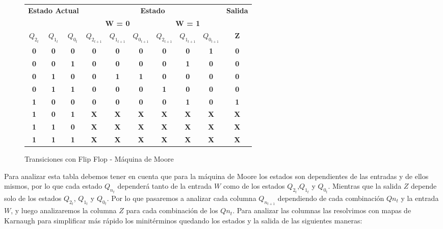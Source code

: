 \documentclass[10pt,a4paper]{article}
\begin{document}
\begin{figure}[H]
	\begin{center}
		\begin{tabular}{|c|c|c|c|c|c|c|c|c|c|}
\hline
\multicolumn{3}{|c|}{\multirow{2}{*}{\textbf{Estado Actual}}} & \multicolumn{6}{c|}{\textbf{Estado}} & \multirow{2}{*}{\textbf{Salida}} \\ \cline{4-9}
\multicolumn{3}{|c|}{} & \multicolumn{3}{c|}{\textbf{W = 0}} & \multicolumn{3}{c|}{\textbf{W = 1}} &  \\ \hline
\textbf{$Q_{2_{t}}$} & \textbf{$Q_{1_{t}}$} & \textbf{$Q_{0_{t}}$} & \textbf{$Q_{2_{t+1}}$} & \textbf{$Q_{1_{t+1}}$} & \textbf{$Q_{0_{t+1}}$} & \textbf{$Q_{2_{t+1}}$} & \textbf{$Q_{1_{t+1}}$} & \textbf{$Q_{0_{t+1}}$} & \textbf{Z} \\ \hline
\textbf{0} & \textbf{0} & \textbf{0} & \textbf{0} & \textbf{0} & \textbf{0} & \textbf{0} & \textbf{0} & \textbf{1} & \textbf{0} \\ \hline
\textbf{0} & \textbf{0} & \textbf{1} & \textbf{0} & \textbf{0} & \textbf{0} & \textbf{0} & \textbf{1} & \textbf{0} & \textbf{0} \\ \hline
\textbf{0} & \textbf{1} & \textbf{0} & \textbf{0} & \textbf{1} & \textbf{1} & \textbf{0} & \textbf{0} & \textbf{0} & \textbf{0} \\ \hline
\textbf{0} & \textbf{1} & \textbf{1} & \textbf{0} & \textbf{0} & \textbf{0} & \textbf{1} & \textbf{0} & \textbf{0} & \textbf{0} \\ \hline
\textbf{1} & \textbf{0} & \textbf{0} & \textbf{0} & \textbf{0} & \textbf{0} & \textbf{0} & \textbf{1} & \textbf{0} & \textbf{1} \\ \hline
\textbf{1} & \textbf{0} & \textbf{1} & \textbf{X} & \textbf{X} & \textbf{X} & \textbf{X} & \textbf{X} & \textbf{X} & \textbf{X} \\ \hline
\textbf{1} & \textbf{1} & \textbf{0} & \textbf{X} & \textbf{X} & \textbf{X} & \textbf{X} & \textbf{X} & \textbf{X} & \textbf{X} \\ \hline
\textbf{1} & \textbf{1} & \textbf{1} & \textbf{X} & \textbf{X} & \textbf{X} & \textbf{X} & \textbf{X} & \textbf{X} & \textbf{X} \\ \hline
		\end{tabular}
		\caption{Transiciones con Flip Flop - Máquina de Moore} 
		\label{2_fig2}
	\end{center}
\end{figure}

Para analizar esta tabla debemos tener en cuenta que para la máquina de Moore los estados son dependientes de las entradas y de ellos mismos, por lo que cada estado $Q_{n_{t}}$ depender\'a tanto de la entrada $W$ como de los estados $Q_{2_{t}}$,$Q_{1_{t}}$ y $Q_{0_{t}}$. Mientras que la salida $Z$ depende solo de los estados $Q_{2_{t}}$, $Q_{1_{t}}$ y $Q_{0_{t}}$. Por lo que pasaremos a analizar cada columna $Q_{n_{t+1}}$ dependiendo de cada combinaci\'on $Q{n_{t}}$ y la entrada $W$, y luego analizaremos la columna $Z$ para cada combinaci\'on de los $Q{n_{t}}$. Para analizar las columnas las resolvimos con mapas de Karnaugh para simplificar más rápido los minit\'erminos quedando los estados y la salida de las siguientes maneras:
	
\end{document}

